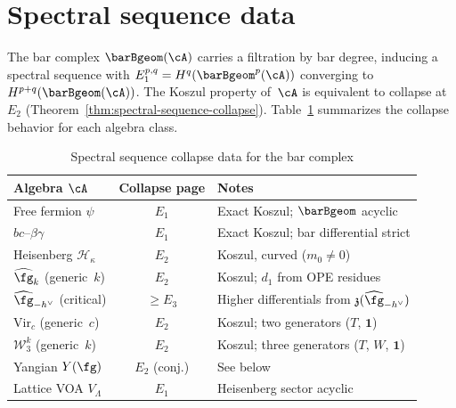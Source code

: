 \section*{Spectral sequence data}
\label{sec:spectral-sequence-data}

The bar complex $\barBgeom(\cA)$ carries a filtration by bar degree,
inducing a spectral sequence with
$E_1^{p,q} = H^q(\barBgeom^p(\cA))$
converging to $H^{p+q}(\barBgeom(\cA))$.
The Koszul property of~$\cA$ is equivalent to collapse at~$E_2$
(Theorem~\ref{thm:spectral-sequence-collapse}).
Table~\ref{tab:spectral-data} summarizes the collapse behavior
for each algebra class.

\begin{table}[ht]
\centering
\caption{Spectral sequence collapse data for the bar complex}
\label{tab:spectral-data}
\renewcommand{\arraystretch}{1.4}
{\small
\begin{tabular}{|l|c|l|}
\hline
\textbf{Algebra $\cA$}
  & \textbf{Collapse page}
  & \textbf{Notes} \\
\hline
Free fermion $\psi$
  & $E_1$
  & Exact Koszul; $\barBgeom$ acyclic \\
\hline
$bc$--$\beta\gamma$
  & $E_1$
  & Exact Koszul; bar differential strict \\
\hline
Heisenberg $\mathcal{H}_\kappa$
  & $E_2$
  & Koszul, curved ($m_0 \ne 0$) \\
\hline
$\widehat{\fg}_k$ (generic~$k$)
  & $E_2$
  & Koszul; $d_1$ from OPE residues \\
\hline
$\widehat{\fg}_{-h^\vee}$ (critical)
  & $\ge E_3$
  & Higher differentials from $\mathfrak{z}(\widehat{\fg}_{-h^\vee})$ \\
\hline
$\mathrm{Vir}_c$ (generic~$c$)
  & $E_2$
  & Koszul; two generators ($T$, $\mathbf{1}$) \\
\hline
$\mathcal{W}_3^k$ (generic~$k$)
  & $E_2$
  & Koszul; three generators ($T$, $W$, $\mathbf{1}$) \\
\hline
Yangian $Y(\fg)$
  & $E_2$ (conj.)
  & See below \\
\hline
Lattice VOA $V_\Lambda$
  & $E_1$
  & Heisenberg sector acyclic \\
\hline
\end{tabular}
}
\end{table}

